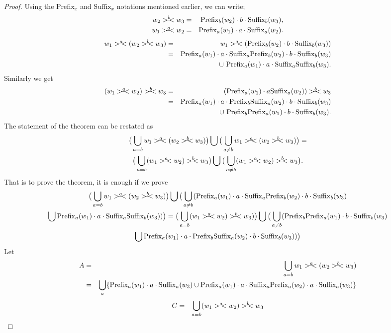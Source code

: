 \documentclass{llncs}
\newcommand{\cd}{\cdot}
\newcommand{\p}{\mathrm{Prefix}}
\newcommand{\s}{\mathrm{Suffix}}
\newcommand{\rs}{\hspace{-3.5mm}-\hspace{-2mm}<}
\begin{document}
\begin{proof}
Using the $\p_x$ and $\s_x$ notations mentioned earlier, we can write;
\begin{eqnarray*}
w_2>^b\rs w_3&=&\p_b(w_2)\cd b\cd \s_b(w_3),\\
w_1>^a\rs w_2&=&\p_a(w_1)\cd a\cd \s_a(w_2).
\end{eqnarray*}
\begin{eqnarray}\label{as1}
w_1>^a\rs(w_2>^b\rs w_3)&=&w_1>^a\rs(\p_b(w_2)\cd b\cd \s_b(w_3))\nonumber\\
        &=&\p_a(w_1)\cd a\cd\s_a\p_b(w_2)\cd b\cd\s_b(w_3) \nonumber\\      &&\cup~ \p_a(w_1)\cd a\cd\s_a\s_b(w_3).
\end{eqnarray}
Similarly we get
\begin{eqnarray}\label{as2}
(w_1>^a\rs w_2)>^b\rs w_3&=&(\p_a(w_1)\cd a\s_a(w_2))>^b\rs w_3\nonumber\\
        &=&\p_a(w_1)\cd a\cd\p_b\s_a(w_2)\cd b\cd\s_b(w_3)\nonumber\\
        &&\cup~\p_b\p_a(w_1)\cd b\cd\s_b(w_3).
\end{eqnarray}
The statement of the theorem can be restated as
\begin{multline*}
\big(\bigcup_{a=b}w_1>^a\rs(w_2>^b\rs w_3)\big)\bigcup\big( \bigcup_{a\neq b}w_1>^a\rs(w_2>^b\rs w_3)\big)=\\\big(\bigcup_{a=b}(w_1>^a\rs w_2)>^b\rs w_3\big)\bigcup\big(\bigcup_{a\neq b}(w_1>^a\rs w_2)>^b\rs w_3\big).
\end{multline*}
That is to prove the theorem, it is enough if we prove
\begin{multline}\label{as3}
\big(\bigcup_{a=b}w_1>^a\rs(w_2>^b\rs w_3)\big)\bigcup\big( \bigcup_{a\neq b}(\p_a(w_1)\cd a\cd\s_a\p_b(w_2)\cd b\cd\s_b(w_3)\\
\bigcup\p_a(w_1)\cd a\cd\s_a\s_b(w_3))\big)=\big(\bigcup_{a=b}(w_1>^a\rs w_2)>^b\rs w_3)\big)\bigcup\big( \bigcup_{a\neq b}(\p_b\p_a(w_1)\cd b\cd\s_b(w_3)
\\\bigcup\p_a(w_1)\cd a \cd\p_b\s_a(w_2)\cd b\cd\s_b(w_3))\big)
\end{multline}
Let
\begin{eqnarray*}
A &=&\bigcup_{a=b}w_1>^a\rs (w_2>^b\rs w_3)\\
    &=&\bigcup_a\{\p_a(w_1)\cd a\cd\s_a(w_3)\cup \p_a(w_1)\cd a\cd\s_a\p_a(w_2)\cd a\cd \s_a(w_3)\}
\end{eqnarray*}
\begin{eqnarray*}
C &=&\bigcup_{a=b}(w_1>^a\rs w_2)>^b\rs w_3\\

\end{eqnarray*}
\end{proof}
\end{document}
